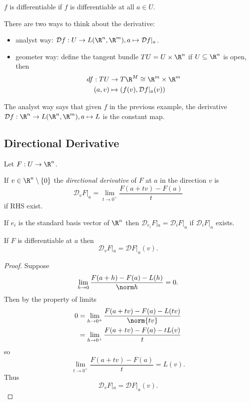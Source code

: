 \documentclass[a4paper]{article}
\newcommand*{\D}{\mathcal{D}}
\theoremstyle{definition}
\begin{document}
\begin{definition}[Differentiability]
  \(f\) is differentiable if \(f\) is differentiable at all \(a \in U\).
\end{definition}

There are two ways to think about the derivative:
\begin{itemize}
\item analyst way: \(\D f: U \to L(\R^n, \R^m), a \mapsto \D f|_a\). 
\item geometer way: define the tangent bundle \(TU = U \times \R^n\) if \(U \subseteq \R^n\) is open, then
  \begin{align*}
    df: TU &\to T\R^M \cong \R^m \times \R^m \\
    (a, v) &\mapsto (f(v), \D f|_a(v))
  \end{align*}
\end{itemize}

The analyst way says that given \(f\) in the previous example, the derivative \(\D f: \R^n \to L(\R^n, \R^m), a \mapsto L\) is the constant map.

\subsection{Directional Derivative}

Let \(F: U \to \R^n\).

\begin{definition}
  If \(v \in \R^n\setminus \{0\}\) the \emph{directional derivative} of \(F\) at \(a\) in the direction \(v\) is
  \[
    \D_v F|_a = \lim_{t \to 0^+} \frac{F(a + tv) - F(a)}{t}
  \]
  if RHS exist.
\end{definition}

\begin{eg}
  If \(e_i\) is the standard basis vector of \(\R^n\) then \(\D_{e_i} F|_a = \D_i F|_a\) if \(\D_i F|_a\) exists.
\end{eg}

\begin{proposition}
  If \(F\) is differentiable at \(a\) then
  \[
    \D_v F|_a = \D F|_a (v).
  \]
\end{proposition}

\begin{proof}
  Suppose
  \[
    \lim_{h \to 0} \frac{F(a + h) - F(a) - L(h)}{\norm h} = 0.
  \]
  Then by the property of limits
  \begin{align*}
    0 &= \lim_{h \to 0^+} \frac{F(a + tv) - F(a) - L(tv)}{\norm{tv}} \\
      &= \lim_{h \to 0^+} \frac{F(a + tv) - F(a) - t L(v)}{t}
  \end{align*}
  so
  \[
    \lim_{t \to 0^+} \frac{F(a + tv) - F(a)}{t} = L(v).
  \]
  Thus
  \[
    \D_v F|_a = \D F|_a(v).
  \]
\end{proof}
\end{document}
